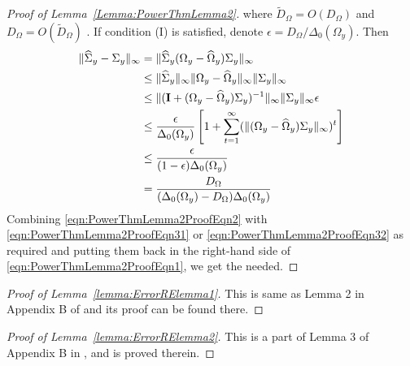 \begin{proof}[Proof of Lemma~\ref{Lemma:PowerThmLemma2}]
%
where $\tilde D_\Omega = O(D_\Omega)$ and $D_\Omega = O(\tilde D_\Omega)$ \citep{BickelLevina08}. If condition (I) is satisfied, denote $\epsilon = D_\Omega / \Delta_0 (\Omega_y)$. Then
%
\begin{align}
\| \widehat \Sigma_y - \Sigma_y \|_\infty &= \| \widehat \Sigma_y (\Omega_y - \widehat \Omega_y) \Sigma_y \|_\infty \notag\\
& \leq \| \widehat \Sigma_y \|_\infty \| \Omega_y - \widehat \Omega_y \|_\infty
\| \Sigma_y \|_\infty \notag\\
& \leq \| ({\mathbf{I}} + (\Omega_y - \widehat \Omega_y) \Sigma_y)^{-1}\|_\infty \| \Sigma_y \|_\infty \epsilon \notag\\
& \leq \frac{\epsilon}{\Delta_0( \Omega_y)}
\left[ 1 + \sum_{t=1}^\infty (\| (\Omega_y - \widehat \Omega_y) \Sigma_y \|_\infty)^t \right] \notag\\
& \leq \frac{\epsilon}{(1- \epsilon) \Delta_0( \Omega_y)} \notag\\
& = \frac{D_\Omega}{(\Delta_0 (\Omega_y) - D_\Omega ) \Delta_0 (\Omega_y)}\label{eqn:PowerThmLemma2ProofEqn32}
\end{align}
%
Combining \eqref{eqn:PowerThmLemma2ProofEqn2} with \eqref{eqn:PowerThmLemma2ProofEqn31} or \eqref{eqn:PowerThmLemma2ProofEqn32} as required and putting them back in the right-hand side of \eqref{eqn:PowerThmLemma2ProofEqn1}, we get the needed.
\end{proof}

\begin{proof}[Proof of Lemma~\ref{lemma:ErrorRElemma1}]
This is same as Lemma 2 in Appendix B of \cite{LinEtal16} and its proof can be found there.
\end{proof}

\begin{proof}[Proof of Lemma~\ref{lemma:ErrorRElemma2}]
This is a part of Lemma 3 of Appendix B in \cite{LinEtal16}, and is proved therein.
\end{proof}